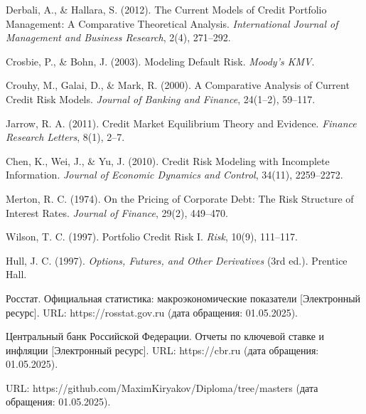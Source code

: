 \documentclass[]{article}
\begin{document}
	
	\newpage
	\begin{thebibliography}{9}
		Derbali, A., \& Hallara, S. (2012). The Current Models of Credit Portfolio Management: A Comparative Theoretical Analysis. \textit{International Journal of Management and Business Research}, 2(4), 271–292.
		
		Crosbie, P., \& Bohn, J. (2003). Modeling Default Risk. \textit{Moody’s KMV}.
		
		Crouhy, M., Galai, D., \& Mark, R. (2000). A Comparative Analysis of Current Credit Risk Models. \textit{Journal of Banking and Finance}, 24(1–2), 59–117.
		
		Jarrow, R. A. (2011). Credit Market Equilibrium Theory and Evidence. \textit{Finance Research Letters}, 8(1), 2–7.
		
		Chen, K., Wei, J., \& Yu, J. (2010). Credit Risk Modeling with Incomplete Information. \textit{Journal of Economic Dynamics and Control}, 34(11), 2259–2272.
		
		Merton, R. C. (1974). On the Pricing of Corporate Debt: The Risk Structure of Interest Rates. \textit{Journal of Finance}, 29(2), 449–470.
		
		Wilson, T. C. (1997). Portfolio Credit Risk I. \textit{Risk}, 10(9), 111–117.
		
		Hull, J. C. (1997). \textit{Options, Futures, and Other Derivatives} (3rd ed.). Prentice Hall.
		
		Росстат. Официальная статистика: макроэкономические показатели [Электронный ресурс]. URL: https://rosstat.gov.ru (дата обращения: 01.05.2025).  
		
		Центральный банк Российской Федерации. Отчеты по ключевой ставке и инфляции [Электронный ресурс]. URL: https://cbr.ru (дата обращения: 01.05.2025).  
		
		URL: https://github.com/MaximKiryakov/Diploma/tree/masters (дата обращения: 01.05.2025).
		
	\end{thebibliography}
	

	
	
	
\end{document}
